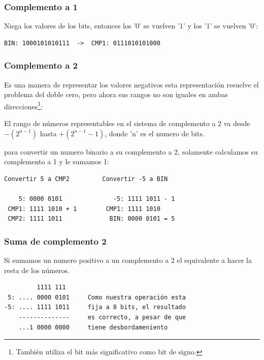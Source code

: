 \documentclass[11pt]{article}
\begin{document}
\subsubsection*{Complemento a 1}
\label{sec:org8d92fac}
Niega los valores de los bits, entonces los '0' se vuelven '1' y los '1' se vuelven '0':

\begin{verbatim}
BIN: 1000101010111  ->  CMP1: 0111010101000
\end{verbatim}

\subsubsection*{Complemento a 2}
\label{sec:org1d13dc8}
Es una manera de representar los valores negativos esta representación resuelve el problema del doble cero, pero ahora sus rangos no son iguales en ambas direcciones\footnote{También utiliza el bit más significativo como bit de signo.}:

\begin{mdframed}
El rango de números representables en el sistema de complemento a 2 va desde \(-(2^{n-1})\) hasta \(+(2^{n-1} - 1)\), donde 'n' es el numero de bits.
\end{mdframed}

para convertir un numero binario a su complemento a 2, solamente calculamos su complemento a 1 y le sumamos 1:

\begin{verbatim}
Convertir 5 a CMP2         Convertir -5 a BIN

    5: 0000 0101              -5: 1111 1011 - 1
 CMP1: 1111 1010 + 1        CMP1: 1111 1010
 CMP2: 1111 1011             BIN: 0000 0101 = 5
\end{verbatim}

\subsubsection*{Suma de complemento 2}
\label{sec:org9548b8c}
Si sumamos un numero positivo a un complemento a 2 el equivalente a hacer la resta de los números.

\begin{verbatim}
         1111 111 
 5: .... 0000 0101     Como nuestra operación esta
-5: .... 1111 1011     fija a 8 bits, el resultado 
    --------------     es correcto, a pesar de que 
    ...1 0000 0000     tiene desbordameniento
\end{verbatim}
\end{document}
